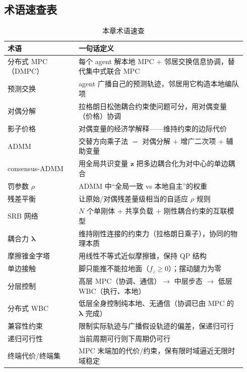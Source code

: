 
\subsection*{术语速查表}
\begin{table}[H]\centering\small
\caption{本章术语速查}
\label{tab:dmpc-glossary}
\begin{tabular}{p{0.28\linewidth}p{0.66\linewidth}}
\toprule
术语 & 一句话定义 \\
\midrule
分布式 MPC（DMPC） & 每个 agent 解本地 MPC $+$ 邻居交换信息协调，替代集中式联合 MPC \\
预测交换 & agent 广播自己的预测轨迹，邻居用它构造本地编队项 \\
对偶分解 & 拉格朗日松弛耦合约束使问题可分，用对偶变量（价格）协调 \\
影子价格 & 对偶变量的经济学解释——维持约束的边际代价 \\
ADMM & 交替方向乘子法 $=$ 对偶分解 $+$ 增广二次项 $+$ 辅助变量 \\
consensus-ADMM & 用全局共识变量 $\mathbf{z}$ 把多边耦合化为对中心的单边耦合 \\
罚参数 $\rho$ & ADMM 中“全局一致 vs 本地自主”的权重 \\
残差平衡 & 让原始/对偶残差量级相当的自适应 $\rho$ 规则 \\
SRB 网络 & $N$ 个单刚体 $+$ 共享负载 $+$ 刚性耦合约束的互联模型 \\
耦合力 $\boldsymbol{\lambda}$ & 维持刚性连接的约束力（拉格朗日乘子），协同的物理本质 \\
摩擦锥金字塔 & 用线性不等式近似摩擦锥，保持 QP 结构 \\
单边接触 & 脚只能推不能拉地面（$f_z\ge0$）；摆动腿力为零 \\
分层控制 & 高层 MPC（协调、通信）$\to$ 中层步态 $\to$ 低层 WBC（执行、本地） \\
分布式 WBC & 低层全身控制纯本地、无通信（协调已由 MPC 的 $\boldsymbol{\lambda}$ 完成） \\
兼容性约束 & 限制实际轨迹与广播假设轨迹的偏差，保递归可行 \\
递归可行性 & 当前周期可行则下周期仍可行 \\
终端代价/终端集 & MPC 末端加的代价/约束，保有限时域逼近无限时域稳定 \\
\bottomrule
\end{tabular}
\end{table}

